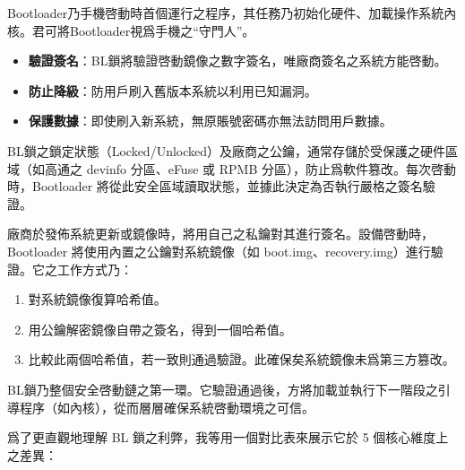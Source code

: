 


Bootloader乃手機啓動時首個運行之程序，其任務乃初始化硬件、加載操作系統內核。君可將Bootloader視爲手機之“守門人”。


\begin{itemize}
  \item \textbf{驗證簽名}：BL鎖將驗證啓動鏡像之數字簽名，唯廠商簽名之系統方能啓動。
  \item \textbf{防止降級}：防用戶刷入舊版本系統以利用已知漏洞。
  \item \textbf{保護數據}：即使刷入新系統，無原賬號密碼亦無法訪問用戶數據。
\end{itemize}


BL鎖之鎖定狀態（Locked/Unlocked）及廠商之公鑰，通常存儲於受保護之硬件區域（如高通之 devinfo 分區、eFuse 或 RPMB 分區），防止爲軟件篡改。每次啓動時，Bootloader 將從此安全區域讀取狀態，並據此決定為否執行嚴格之簽名驗證。


廠商於發佈系統更新或鏡像時，將用自己之私鑰對其進行簽名。設備啓動時，Bootloader 將使用內置之公鑰對系統鏡像（如 boot.img、recovery.img）進行驗證。它之工作方式乃：

\begin{enumerate}
  \item 對系統鏡像復算哈希值。
  \item 用公鑰解密鏡像自帶之簽名，得到一個哈希值。
  \item 比較此兩個哈希值，若一致則通過驗證。此確保矣系統鏡像未爲第三方篡改。
\end{enumerate}


BL鎖乃整個安全啓動鏈之第一環。它驗證通過後，方將加載並執行下一階段之引導程序（如內核），從而層層確保系統啓動環境之可信。


爲了更直觀地理解 BL 鎖之利弊，我等用一個對比表來展示它於 5 個核心維度上之差異：

